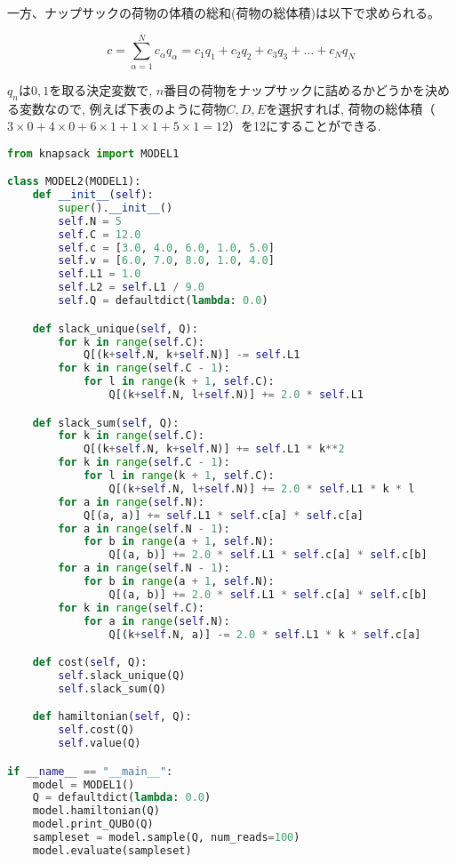 \documentclass[uplatex,dvipdfmx,a4paper,11pt,oneside,openany]{jsbook}
\begin{document}
一方、ナップサックの荷物の体積の総和(荷物の総体積)は以下で求められる。

\[
c = \sum_{\alpha=1}^{N}c_\alpha q_\alpha = c_1 q_1 + c_2 q_2 + c_3 q_3 + \dots + c_N q_N
\]

$q_n$は$0,1$を取る決定変数で, $n$番目の荷物をナップサックに詰めるかどうかを決める変数なので, 例えば下表のように荷物$C,D,E$を選択すれば, 荷物の総体積（$3\times 0+4\times 0+6\times 1+1\times 1+5\times 1=12$）を12にすることができる.\\

\begin{lstlisting}[language=Python]
from knapsack import MODEL1

class MODEL2(MODEL1):
    def __init__(self):
        super().__init__()
        self.N = 5
        self.C = 12.0
        self.c = [3.0, 4.0, 6.0, 1.0, 5.0]
        self.v = [6.0, 7.0, 8.0, 1.0, 4.0]
        self.L1 = 1.0
        self.L2 = self.L1 / 9.0
        self.Q = defaultdict(lambda: 0.0)

    def slack_unique(self, Q):
        for k in range(self.C):
            Q[(k+self.N, k+self.N)] -= self.L1
        for k in range(self.C - 1):
            for l in range(k + 1, self.C):
                Q[(k+self.N, l+self.N)] += 2.0 * self.L1

    def slack_sum(self, Q):
        for k in range(self.C):
            Q[(k+self.N, k+self.N)] += self.L1 * k**2
        for k in range(self.C - 1):
            for l in range(k + 1, self.C):
                Q[(k+self.N, l+self.N)] += 2.0 * self.L1 * k * l
        for a in range(self.N):
            Q[(a, a)] += self.L1 * self.c[a] * self.c[a]
        for a in range(self.N - 1):
            for b in range(a + 1, self.N):
                Q[(a, b)] += 2.0 * self.L1 * self.c[a] * self.c[b]
        for a in range(self.N - 1):
            for b in range(a + 1, self.N):
                Q[(a, b)] += 2.0 * self.L1 * self.c[a] * self.c[b]
        for k in range(self.C):
            for a in range(self.N):
                Q[(k+self.N, a)] -= 2.0 * self.L1 * k * self.c[a]

    def cost(self, Q):
        self.slack_unique(Q)
        self.slack_sum(Q)

    def hamiltonian(self, Q):
        self.cost(Q)
        self.value(Q)

if __name__ == "__main__":
    model = MODEL1()
    Q = defaultdict(lambda: 0.0)
    model.hamiltonian(Q)
    model.print_QUBO(Q)
    sampleset = model.sample(Q, num_reads=100)
    model.evaluate(sampleset)
\end{lstlisting}
\end{document}
